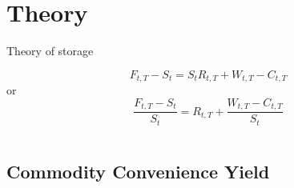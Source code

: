 \section{Theory}
\label{sec:theory}
Theory of storage

\begin{equation}
 \label{eq:strg1}
 F_{t,T} - S_t = S_t R_{t, T} + W_{t, T} - C_{t, T}
\end{equation}
or
\begin{equation}
\label{eq:strg2}
 \frac{F_{t,T} - S_t}{S_t} = R_{t, T} + \frac{W_{t, T} - C_{t, T}}{S_t}
\end{equation}

\begin{equation}
 \label{eq:uip}
\end{equation}

\subsection{Commodity Convenience Yield}


